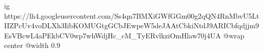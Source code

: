  
 
 
 
 

\ifcmt
  ig https://lh4.googleusercontent.com/Ss4qn7BMXiGWfGGm00g2qQN4RnMbvU5LtIIZPcUv4voDLXh3IibKOMUGtgGCbJEwpeW5deJAAtCbkiNtdJ9ARICbfqdjjm9EsVBcwL4aPEkbCV0wp7whWdjHc_cM_TyERvlkziOmHlaw70j4UA
  @wrap center
  @width 0.9
\fi
